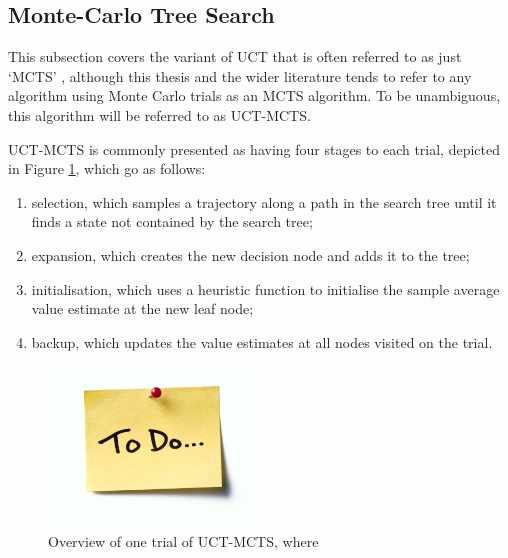     
    \subsection{Monte-Carlo Tree Search}
    \label{sec:2-4-3-mcts}


        This subsection covers the variant of UCT that is often referred to as just `MCTS' , although this thesis and the wider literature tends to refer to any algorithm using Monte Carlo trials as an MCTS algorithm. To be unambiguous, this algorithm will be referred to as UCT-MCTS.

        UCT-MCTS is commonly presented as having four stages to each trial, depicted in Figure \ref{fig:mcts}, which go as follows:
        \begin{enumerate}
            \item selection, which samples a trajectory along a path in the search tree until it finds a state not contained by the search tree;
            \item expansion, which creates the new decision node and adds it to the tree;
            \item initialisation, which uses a heuristic function to initialise the sample average value estimate at the new leaf node;
            \item backup, which updates the value estimates at all nodes visited on the trial.
        \end{enumerate}

        \begin{figure}
            \centering\includegraphics[width=0.5\textwidth]{figures/todo.jpg} 
            \caption[Overview of one trial of UCT-MCTS.]{Overview of one trial of UCT-MCTS, where }
            \label{fig:mcts}
        \end{figure}

